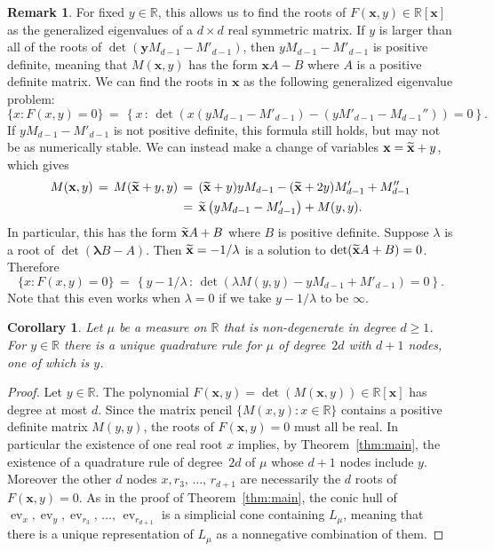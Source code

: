 \documentclass[11pt]{article}
\newtheorem{coro}[theo]{Corollary}
\theoremstyle{definition}
\newtheorem{rema}[theo]{Remark}
\numberwithin{equation}{section}
\numberwithin{figure}{section}
\numberwithin{table}{section}
\DeclareMathOperator\ev{ev}
\newcommand\R{\mathbb R}
\newcommand\x{\mathbf{x}}
\newcommand\y{\mathbf{y}}
\newcommand\blambda{{\bm \lambda}}
\let\oldtilde\tilde
\renewcommand*{\tilde}[1]{\mathchoice{\widetilde{#1}}{\widetilde{#1}}{\oldtilde{#1}}{\oldtilde{#1}}}
\begin{document}
\begin{rema}\label{rem:GenEigBilinear}
For fixed $y\in \R$, this allows us to find the roots of $F(\x,y)\in \R[\x]$ as the generalized eigenvalues of a $d\times d$ real symmetric matrix. If $y$ is larger than all of the roots of $\det(\y M_{d-1} - M'_{d-1})$, then $yM_{d-1} - M'_{d-1}$ is positive definite, meaning that $M(\x,y)$ has the form $\x A-B$ where $A$ is a positive definite matrix. We can find the roots in $\x$ as the following generalized eigenvalue problem:
\[
\{x : F(x,y)=0\} \, = \, \left\{ x \, : \, \det\left(x\left(yM_{d-1} - M'_{d-1}\right) - \left(yM'_{d-1} -M_{d-1}''\right)\right)=0\right\}.
\]
If $yM_{d-1} - M'_{d-1}$ is not positive definite, this formula still holds, but may not be as numerically stable. We can instead make a change of variables $\x=\tilde{\x}+y$, which gives
\begin{align*}
M(\x,y) \, = \, M(\tilde{\x}+y,y) &\, = \, (\tilde{\x}+y)yM_{d-1}-(\tilde{\x}+2y)M'_{d-1}+ M''_{d-1} \\
& \, = \, \tilde{\x}\left(yM_{d-1} - M'_{d-1}\right) + M(y,y).
\end{align*}
In particular, this has the form $\tilde{\x}A+B$ where $B$ is positive definite. Suppose $\lambda$ is a root of $\det(\blambda B- A)$. Then $\tilde{\x}=-1/\lambda$ is a solution to $\det(\tilde{\x}A+B)=0$. Therefore
\[
\{x : F(x,y)=0\} \, = \, \left\{ y-1/\lambda \, : \, \det\left(\lambda M(y,y) - yM_{d-1} + M'_{d-1}\right)=0\right\}.
\]
Note that this even works when $\lambda = 0$ if we take $y-1/\lambda$ to be $\infty$.
\end{rema}

\begin{coro}\label{cor:Uniqueness}
Let $\mu$ be a measure on $\R$ that is non-degenerate in degree $d\geq1$. For $y\in \R$ there is a unique quadrature rule for $\mu$ of degree~$2d$ with $d+1$ nodes, one of which is $y$.
\end{coro}

\begin{proof}
Let $y\in \R$. The polynomial $F(\x,y) = \det(M(\x,y)) \in \R[\x]$ has degree at most $d$. Since the matrix pencil $\{M(x,y): x\in \R\}$ contains a positive definite matrix $M(y,y)$, the roots of $F(\x,y)=0$ must all be real. In particular the existence of one real root $x$ implies, by Theorem~\ref{thm:main}, the existence of a quadrature rule of degree~$2d$ of $\mu$ whose $d+1$ nodes include $y$. Moreover the other $d$ nodes $x, r_3,\,\hdots,\,r_{d+1}$ are necessarily the $d$ roots of $F(\x,y)=0$. As in the proof of Theorem~\ref{thm:main}, the conic hull of $\ev_x, \ev_y, \ev_{r_3},\,\hdots,\,\ev_{r_{d+1}}$ is a simplicial cone containing $L_{\mu}$, meaning that there is a unique representation of $L_{\mu}$ as a nonnegative combination of them.
\end{proof}
\end{document}

